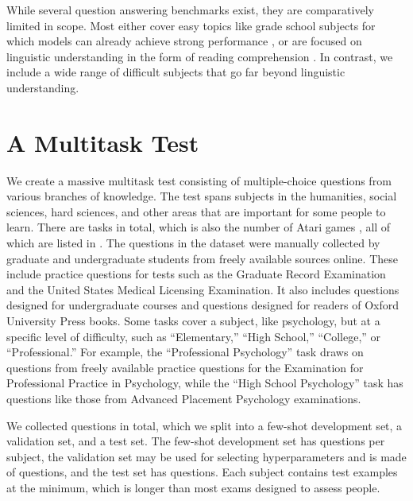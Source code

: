\documentclass{article} \usepackage{iclr2021_conference, times}
\begin{document}
While several question answering benchmarks exist, they are comparatively limited in scope. Most either cover easy topics like grade school subjects for which models can already achieve strong performance \citep{Clark2018ARCAI2, khot2019qasc, OpenBookQA2018,Clark2019RegentsScienceExams}, or are focused on linguistic understanding in the form of reading comprehension \citep{lai2017race, richardson-etal-2013-mctest}. In contrast, we include a wide range of difficult subjects that go far beyond linguistic understanding.





 \section{A Multitask Test}



We create a massive multitask test consisting of multiple-choice questions from various branches of knowledge.
The test spans subjects in the humanities, social sciences, hard sciences, and other areas that are important for some people to learn. 
There are  tasks in total, 
which is also the number of Atari games \citep{Bellemare2013Atari}, 
all of which are listed in .
The questions in the dataset were manually collected by graduate and undergraduate students from freely available sources online. These include practice questions for tests such as the Graduate Record Examination and the United States Medical Licensing Examination. It also includes questions designed for undergraduate courses and questions designed for readers of Oxford University Press books. 
Some tasks cover a subject, like psychology, but at a specific level of difficulty, such as ``Elementary,'' ``High School,'' ``College,'' or ``Professional.''
For example, the ``Professional Psychology'' task draws on questions from freely available practice questions for the Examination for Professional Practice in Psychology, while the ``High School Psychology'' task has questions like those from Advanced Placement Psychology examinations.


We collected  questions in total, which we split into a few-shot development set, a validation set, and a test set. The few-shot development set has  questions per subject, the validation set may be used for selecting hyperparameters and is made of  questions, and the test set has  questions. Each subject contains  test examples at the minimum, which is longer than most exams designed to assess people.
\end{document}
